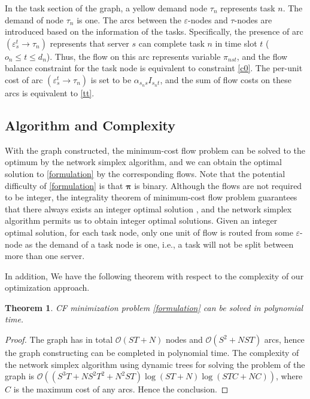 \documentclass[conference, 10pt, ﬁnal, letterpaper, twocolumn]{IEEEtran}
\newtheorem{theorem}{Theorem}
\begin{document}
In the task section of the graph, a yellow demand node $\tau_n$ represents task $n$. The demand of node $\tau_n$ is one. The arcs between the $\varepsilon$-nodes and $\tau$-nodes are introduced based on the information of the tasks. Specifically, the presence of arc $(\varepsilon^{t}_{s}\rightarrow\tau_{n})$ represents that server $s$ can complete task $n$ in time slot $t$ ($o_n \leq t \leq d_n$). Thus, the flow on this arc represents variable $\pi_{nst}$, and the flow balance constraint for the task node is equivalent to constraint \eqref{c0}.
The per-unit cost of arc $(\varepsilon^{t}_{s}\rightarrow\tau_n)$ is set to be $\alpha_{s_{n}s}I_{s_{n}t}$, and the sum of flow costs on these arcs is equivalent to \eqref{tt}.



\subsection{Algorithm and Complexity}

With the graph constructed, the minimum-cost flow problem can be solved to the optimum by the network simplex algorithm\cite{10.5555/137406}, and we can obtain the optimal solution to \eqref{formulation} by the corresponding flows. Note that the potential difficulty of \eqref{formulation} is that $\boldsymbol{\pi}$ is binary. Although the flows are not required to be integer, the integrality theorem of minimum-cost flow problem guarantees that there always exists an integer optimal solution \cite[Theorem 11.5]{10.5555/137406}, and the network simplex algorithm permits us to obtain integer optimal solutions. Given an integer optimal solution, for each task node, only one unit of flow is routed from some $\varepsilon$-node as the demand of a task node is one, i.e., a task will not be split between more than one server.

In addition, We have the following theorem with respect to the complexity of our optimization approach.

\begin{theorem}
CF minimization problem \eqref{formulation} can be solved in polynomial time.
\end{theorem}
\begin{proof}
The graph has in total $\mathcal{O}(ST + N)$ nodes and $\mathcal{O}(S^2 + NST)$ arcs, hence the graph constructing can be completed in polynomial time. The complexity of the network simplex algorithm using dynamic trees \cite{tarjan1997dynamic} for solving the problem of the graph is $\mathcal{O}((S^3T + NS^2 T^2+N^2ST)\log(ST + N)\log(STC + NC))$, where $C$ is the maximum cost of any arcs. Hence the conclusion.
\end{proof}
\end{document}
